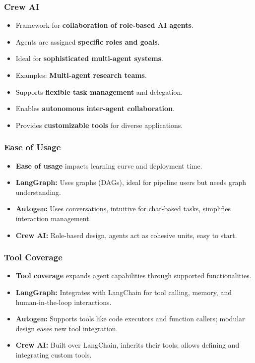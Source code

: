 \begin{frame}[fragile]\frametitle{Crew AI}
\begin{itemize}
    \item Framework for \textbf{collaboration of role-based AI agents}.
    \item Agents are assigned \textbf{specific roles and goals}.
    \item Ideal for \textbf{sophisticated multi-agent systems}.
    \item Examples: \textbf{Multi-agent research teams}.
    \item Supports \textbf{flexible task management} and delegation.
    \item Enables \textbf{autonomous inter-agent collaboration}.
    \item Provides \textbf{customizable tools} for diverse applications.
\end{itemize}
\end{frame}

\begin{frame}[fragile]\frametitle{Ease of Usage}
\begin{itemize}
    \item \textbf{Ease of usage} impacts learning curve and deployment time.
    \item \textbf{LangGraph:} Uses graphs (DAGs), ideal for pipeline users but needs graph understanding.
    \item \textbf{Autogen:} Uses conversations, intuitive for chat-based tasks, simplifies interaction management.
    \item \textbf{Crew AI:} Role-based design, agents act as cohesive units, easy to start.
\end{itemize}
\end{frame}

\begin{frame}[fragile]\frametitle{Tool Coverage}
\begin{itemize}
    \item \textbf{Tool coverage} expands agent capabilities through supported functionalities.
    \item \textbf{LangGraph:} Integrates with LangChain for tool calling, memory, and human-in-the-loop interactions.
    \item \textbf{Autogen:} Supports tools like code executors and function callers; modular design eases new tool integration.
    \item \textbf{Crew AI:} Built over LangChain, inherits their tools; allows defining and integrating custom tools.
\end{itemize}
\end{frame}

